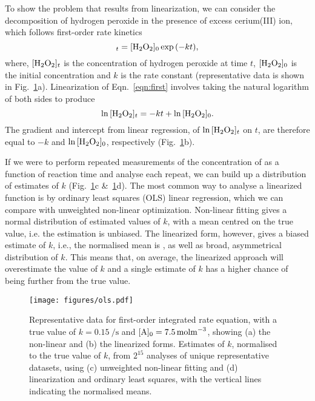 \documentclass[journal=jceda8,manuscript=article]{achemso}
\begin{document}
To show the problem that results from linearization, we can consider the decomposition of hydrogen peroxide  in the presence of excess cerium(III) ion, which follows first-order rate kinetics~\cite{monk_math_2010}
%
\begin{equation}
    [\ce{H2O2}]_t = [\ce{H2O2}]_0\exp{(-kt)},
    \label{eqn:first}
\end{equation}
%
where, $[\ce{H2O2}]_t$ is the concentration of hydrogen peroxide at time $t$, $[\ce{H2O2}]_0$ is the initial concentration and $k$ is the rate constant (representative data is shown in Fig.~\ref{fig:ols}a).
Linearization of Eqn.~\ref{eqn:first} involves taking the natural logarithm of both sides to produce
%
\begin{equation}
    \ln{[\ce{H2O2}]_t} = -kt + \ln{[\ce{H2O2}]_0}.
    \label{eqn:log}
\end{equation}
%
The gradient and intercept from linear regression, of $\ln{[\ce{H2O2}]_t}$ on $t$, are therefore equal to $-k$ and $\ln{[\ce{H2O2}]_0}$, respectively (Fig.~\ref{fig:ols}b).

If we were to perform repeated measurements of the concentration of  as a function of reaction time and analyse each repeat, we can build up a distribution of estimates of $k$ (Fig.~\ref{fig:ols}c \&~\ref{fig:ols}d). 
The most common way to analyse a linearized function is by ordinary least squares (OLS) linear regression, which we can compare with unweighted non-linear optimization. 
Non-linear fitting gives a normal distribution of estimated values of $k$, with a mean centred on the true value, i.e. the estimation is unbiased. 
The linearized form, however, gives a biased estimate of $k$, i.e., the normalised mean is , as well as broad, asymmetrical distribution of $k$. 
This means that, on average, the linearized approach will overestimate the value of $k$ and a single estimate of $k$ has a higher chance of being further from the true value. 
%
\begin{figure}
  \texttt{[image: figures/ols.pdf]}
  \caption{
    Representative data for first-order integrated rate equation, with a true value of $k=\SI{0.15}{\per\second}$ and $[\ce{A}]_0=\SI{7.5}{\mol\m^{-3}}$, showing (a) the non-linear and (b) the linearized forms. 
    Estimates of $k$, normalised to the true value of $k$, from $2^{15}$ analyses of unique representative datasets, using (c) unweighted non-linear fitting and (d) linearization and ordinary least squares, with the vertical lines indicating the normalised means.
    }
  \label{fig:ols}
\end{figure}
%
\end{document}

